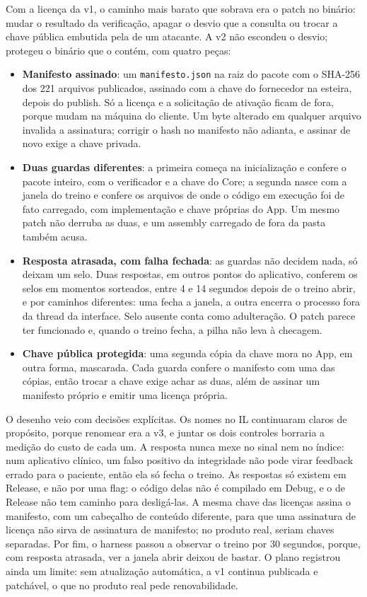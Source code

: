 Com a licença da v1, o caminho mais barato que sobrava era o patch no binário: mudar o resultado da verificação, apagar o desvio que a consulta ou trocar a chave pública embutida pela de um atacante. A v2 não escondeu o desvio; protegeu o binário que o contém, com quatro peças:
\begin{itemize}
\item \textbf{Manifesto assinado}: um \texttt{manifesto.json} na raiz do pacote com o SHA-256 dos 221 arquivos publicados, assinado com a chave do fornecedor na esteira, depois do publish. Só a licença e a solicitação de ativação ficam de fora, porque mudam na máquina do cliente. Um byte alterado em qualquer arquivo invalida a assinatura; corrigir o hash no manifesto não adianta, e assinar de novo exige a chave privada.
\item \textbf{Duas guardas diferentes}: a primeira começa na inicialização e confere o pacote inteiro, com o verificador e a chave do Core; a segunda nasce com a janela do treino e confere os arquivos de onde o código em execução foi de fato carregado, com implementação e chave próprias do App. Um mesmo patch não derruba as duas, e um assembly carregado de fora da pasta também acusa.
\item \textbf{Resposta atrasada, com falha fechada}: as guardas não decidem nada, só deixam um selo. Duas respostas, em outros pontos do aplicativo, conferem os selos em momentos sorteados, entre 4 e 14 segundos depois de o treino abrir, e por caminhos diferentes: uma fecha a janela, a outra encerra o processo fora da thread da interface. Selo ausente conta como adulteração. O patch parece ter funcionado e, quando o treino fecha, a pilha não leva à checagem.
\item \textbf{Chave pública protegida}: uma segunda cópia da chave mora no App, em outra forma, mascarada. Cada guarda confere o manifesto com uma das cópias, então trocar a chave exige achar as duas, além de assinar um manifesto próprio e emitir uma licença própria.
\end{itemize}

O desenho veio com decisões explícitas. Os nomes no IL continuaram claros de propósito, porque renomear era a v3, e juntar os dois controles borraria a medição do custo de cada um. A resposta nunca mexe no sinal nem no índice: num aplicativo clínico, um falso positivo da integridade não pode virar feedback errado para o paciente, então ela só fecha o treino. As respostas só existem em Release, e não por uma flag: o código delas não é compilado em Debug, e o de Release não tem caminho para desligá-las. A mesma chave das licenças assina o manifesto, com um cabeçalho de conteúdo diferente, para que uma assinatura de licença não sirva de assinatura de manifesto; no produto real, seriam chaves separadas. Por fim, o harness passou a observar o treino por 30 segundos, porque, com resposta atrasada, ver a janela abrir deixou de bastar. O plano registrou ainda um limite: sem atualização automática, a v1 continua publicada e patchável, o que no produto real pede renovabilidade.

